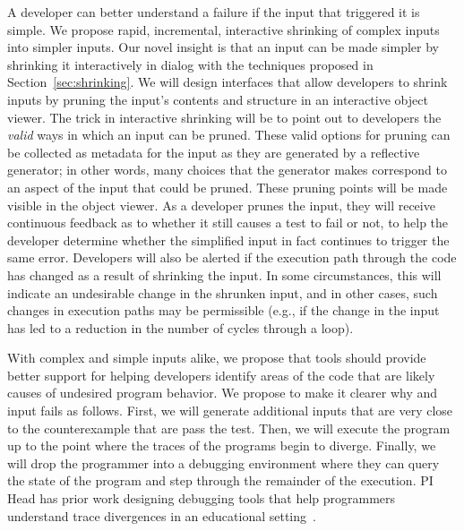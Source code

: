 

A developer can better understand a failure if the input
that triggered it is simple. We propose rapid, incremental,
interactive shrinking of complex inputs into simpler inputs.
Our novel insight is that an input can be made simpler by
shrinking it interactively in dialog with the techniques
proposed in Section~\ref{sec:shrinking}. We will design
interfaces that allow developers to shrink inputs by pruning
the input's contents and structure in an interactive object
viewer. The trick in interactive shrinking will be to point
out to developers the \emph{valid} ways in which an input
can be pruned. These valid options for pruning can be
collected as metadata for the input as they are generated by
a reflective generator; in other words, many choices that
the generator makes correspond to an aspect of the input
that could be pruned. These pruning points will be made
visible in the object viewer. As a developer prunes the
input, they will receive continuous feedback as to whether
it still causes a test to fail or not, to help the developer
determine whether the simplified input in fact continues to
trigger the same error. Developers will also be alerted if
the execution path through the code has changed as a result
of shrinking the input. In some circumstances, this will
indicate an undesirable change in the shrunken input, and in
other cases, such changes in execution paths may be
permissible (e.g., if the change in the input has led to a
reduction in the number of cycles through a loop).

With complex and simple inputs alike, we propose that tools
should provide better support for helping developers
identify areas of the code that are likely causes of
undesired program behavior. We propose to make it clearer
why and input fails as follows. First, we will generate
additional inputs that are very close to the counterexample
that are pass the test. Then, we will execute the program up
to the point where the traces of the programs begin to
diverge. Finally, we will drop the programmer into a
debugging environment where they can query the state of the
program and step through the remainder of the execution. PI
Head has prior work designing debugging tools that help
programmers understand trace divergences in an educational
setting~\cite{suzuki2017tracediff}.  

